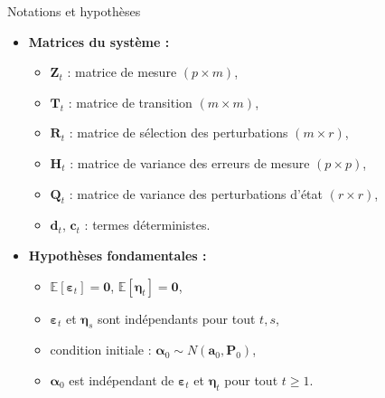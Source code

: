 \documentclass[11pt,aspectratio=169]{beamer}
\newcommand{\E}{\mathbb{E}}
\begin{document}
\begin{frame}{Notations et hypothèses}

\begin{itemize}

\item \textbf{Matrices du système :}
  \begin{itemize}
  \item $\bm{Z}_t$ : matrice de mesure $(p \times m)$,
  \item $\bm{T}_t$ : matrice de transition $(m \times m)$,
  \item $\bm{R}_t$ : matrice de sélection des perturbations $(m \times r)$,
  \item $\bm{H}_t$ : matrice de variance des erreurs de mesure $(p \times p)$,
  \item $\bm{Q}_t$ : matrice de variance des perturbations d'état $(r \times r)$,
  \item $\bm{d}_t$, $\bm{c}_t$ : termes déterministes.\newline
  \end{itemize}

\item \textbf{Hypothèses fondamentales :}
  \begin{itemize}
  \item $\E[\bm{\varepsilon}_t] = \bm{0}$, $\E[\bm{\eta}_t] = \bm{0}$,
  \item $\bm{\varepsilon}_t$ et $\bm{\eta}_s$ sont indépendants pour tout $t, s$,
  \item condition initiale : $\bm{\alpha}_0 \sim N(\bm{a}_0, \bm{P}_0)$,
  \item $\bm{\alpha}_0$ est indépendant de $\bm{\varepsilon}_t$ et $\bm{\eta}_t$ pour tout $t \geq 1$.
  \end{itemize}

\end{itemize}

\end{frame}
\end{document}
